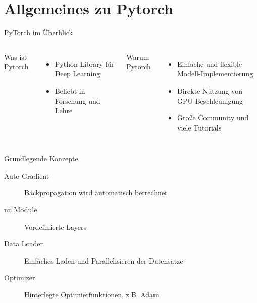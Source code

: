 \section{Allgemeines zu Pytorch}

\begin{frame}{PyTorch im Überblick}
    \begin{columns}[T,onlytextwidth]
        
        Was ist Pytorch
        \begin{itemize}
            \item Python Library für Deep Learning
            \item Beliebt in Forschung und Lehre \cite{bauer}
        \end{itemize}

        Warum Pytorch
        \begin{itemize}
            \item Einfache und flexible Modell-Implementierung
            \item Direkte Nutzung von GPU-Beschleunigung
            \item Große Community und viele Tutorials
        \end{itemize}
    \end{columns}
\end{frame}


\begin{frame}{Grundlegende Konzepte}
    \begin{description}
        \item[Auto Gradient] Backpropagation wird automatisch berrechnet 
        \item[nn.Module] Vordefinierte Layers
        \item[Data Loader] Einfaches Laden und \alert{Parallelisieren} der Datensätze
        \item[Optimizer] Hinterlegte Optimierfunktionen, z.B. Adam   
    \end{description}
    
\end{frame}

